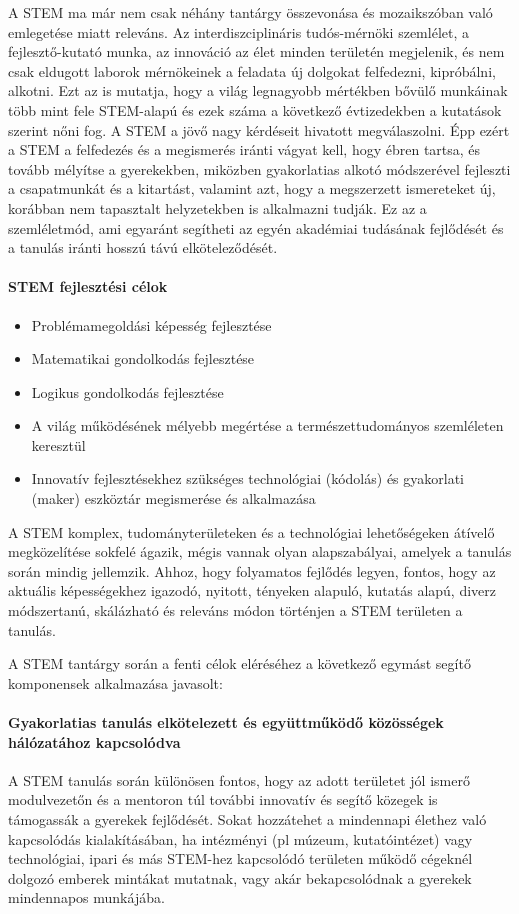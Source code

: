 A STEM ma már nem csak néhány tantárgy összevonása és  mozaikszóban való
emlegetése miatt releváns. Az interdiszciplináris tudós-mérnöki szemlélet, a
fejlesztő-kutató munka, az innováció az élet minden területén megjelenik, és
nem csak eldugott laborok mérnökeinek a feladata új dolgokat felfedezni,
kipróbálni, alkotni. Ezt az is mutatja, hogy a világ legnagyobb mértékben
bővülő munkáinak több mint fele STEM-alapú és ezek száma a következő
évtizedekben a kutatások szerint nőni fog. A STEM a jövő nagy kérdéseit
hivatott megválaszolni. Épp ezért a STEM a felfedezés és a megismerés iránti
vágyat kell, hogy ébren tartsa, és tovább mélyítse a gyerekekben, miközben
gyakorlatias alkotó módszerével fejleszti a csapatmunkát és a kitartást,
valamint azt, hogy a megszerzett ismereteket új, korábban nem tapasztalt
helyzetekben is alkalmazni tudják. Ez az a szemléletmód, ami egyaránt segítheti
az egyén akadémiai tudásának fejlődését és a tanulás iránti hosszú távú
elköteleződését.

\paragraph{STEM fejlesztési célok}
\begin{itemize}
  \item Problémamegoldási képesség fejlesztése
  \item  Matematikai gondolkodás fejlesztése
  \item  Logikus gondolkodás fejlesztése
  \item  A világ működésének mélyebb megértése a természettudományos szemléleten
        keresztül
  \item  Innovatív fejlesztésekhez szükséges technológiai (kódolás) és gyakorlati
        (maker) eszköztár megismerése és alkalmazása
\end{itemize}

A STEM komplex, tudományterületeken és a technológiai lehetőségeken átívelő
megközelítése sokfelé ágazik, mégis vannak olyan alapszabályai, amelyek a
tanulás során mindig jellemzik. Ahhoz, hogy folyamatos fejlődés legyen, fontos,
hogy az aktuális képességekhez igazodó, nyitott, tényeken alapuló, kutatás
alapú, diverz módszertanú, skálázható és releváns módon történjen a STEM
területen a tanulás.

A STEM tantárgy során a fenti célok eléréséhez a következő egymást segítő
komponensek alkalmazása javasolt:

\paragraph{Gyakorlatias tanulás elkötelezett és együttműködő közösségek
  hálózatához kapcsolódva}
A STEM tanulás során különösen fontos, hogy az adott területet jól ismerő
modulvezetőn és a mentoron túl további innovatív és segítő közegek is támogassák a
gyerekek fejlődését. Sokat hozzátehet a mindennapi élethez való kapcsolódás
kialakításában, ha intézményi (pl múzeum, kutatóintézet) vagy technológiai,
ipari és más STEM-hez kapcsolódó területen működő cégeknél dolgozó emberek
mintákat mutatnak, vagy akár bekapcsolódnak a gyerekek mindennapos munkájába.

